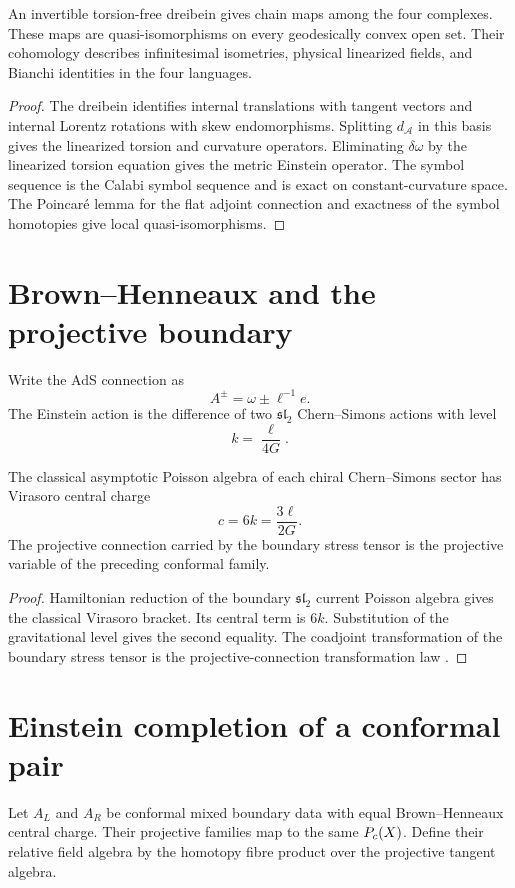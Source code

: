 \begin{theorem}
An invertible torsion-free dreibein gives chain maps among the four complexes.  These maps are quasi-isomorphisms on every geodesically convex open set.  Their cohomology describes infinitesimal isometries, physical linearized fields, and Bianchi identities in the four languages.
\end{theorem}
\begin{proof}
The dreibein identifies internal translations with tangent vectors and internal Lorentz rotations with skew endomorphisms.  Splitting $d_{\mathcal A}$ in this basis gives the linearized torsion and curvature operators.  Eliminating $\delta\omega$ by the linearized torsion equation gives the metric Einstein operator.  The symbol sequence is the Calabi symbol sequence and is exact on constant-curvature space.  The Poincar\'e lemma for the flat adjoint connection and exactness of the symbol homotopies give local quasi-isomorphisms.
\end{proof}

\chapter{Brown--Henneaux and the projective boundary}
Write the AdS connection as
\[
 A^\pm=\omega\pm\ell^{-1}e.
\]
The Einstein action is the difference of two $\mathfrak{sl}_2$ Chern--Simons actions with level
\[
 k=\frac{\ell}{4G}.
\]

\begin{theorem}
The classical asymptotic Poisson algebra of each chiral Chern--Simons sector has Virasoro central charge
\[
 c=6k=\frac{3\ell}{2G}.
\]
The projective connection carried by the boundary stress tensor is the projective variable of the preceding conformal family.
\end{theorem}
\begin{proof}
Hamiltonian reduction of the boundary $\mathfrak{sl}_2$ current Poisson algebra gives the classical Virasoro bracket.  Its central term is $6k$.  Substitution of the gravitational level gives the second equality.  The coadjoint transformation of the boundary stress tensor is the projective-connection transformation law 
\cite{BrownHenneaux}.
\end{proof}

\chapter{Einstein completion of a conformal pair}
Let $A_L$ and $A_R$ be conformal mixed boundary data with equal Brown--Henneaux central charge.  Their projective families map to the same $P_c(X)$.  Define their relative field algebra by the homotopy fibre product over the projective tangent algebra.

